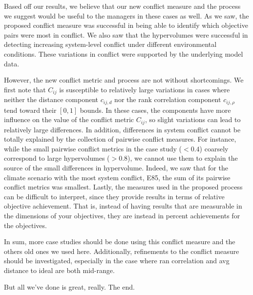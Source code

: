Based off our results, we believe that our new conflict measure and the process we suggest would be useful to the managers in these cases as well. As we saw, the proposed conflict measure was successful in being able to identify which objective pairs were most in conflict. We also saw that the hypervolumes were successful in detecting increasing system-level conflict under different environmental conditions. These variations in conflict were supported by the underlying model data. 

However, the new conflict metric and process are not without shortcomings. We first note that $C_{ij}$ is susceptible to relatively large variations in cases where neither the distance component $c_{ij,d}$ nor the rank correlation component $c_{ij,\rho}$ tend toward their $[0,1]$ bounds. In these cases, the components have more influence on the value of the conflict metric $C_{ij}$, so slight variations can lead to relatively large differences. In addition, differences in system conflict cannot be totally explained by the collection of pairwise conflict measures. For instance, while the small pairwise conflict metrics in the case study ($< 0.4$) coarsely correspond to large hypervolumes ($> 0.8$), we cannot use them to explain the source of the small differences in hypervolume. Indeed, we saw that for the climate scenario with the most system conflict, E85, the sum of its pairwise conflict metrics was smallest. Lastly, the measures used in the proposed process can be difficult to interpret, since they provide results in terms of relative objective achievement. That is, instead of having results that are measurable in the dimensions of your objectives, they are instead in percent achievements for the objectives.

In sum, more case studies should be done using this conflict measure and the others old ones we used here. Additionally, refinements to the conflict measure should be investigated, especially in the case where ran correlation and avg distance to ideal are both mid-range.

But all we've done is great, really. The end.